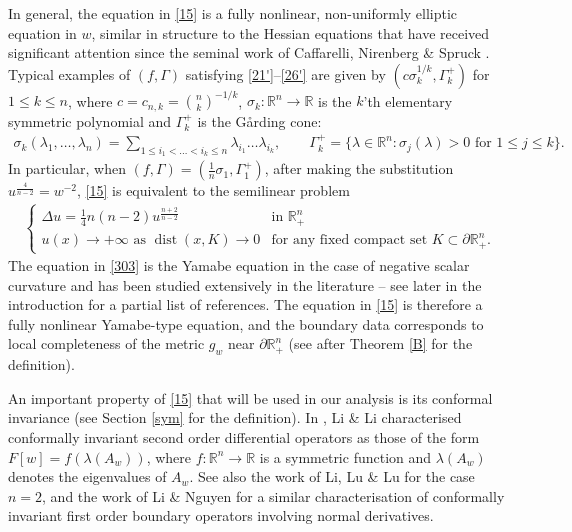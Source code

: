 \documentclass[12pt]{article}
\numberwithin{equation}{section}
\theoremstyle{plain}
\theoremstyle{definition}
\begin{document}
In general, the equation in \eqref{15} is a fully nonlinear, non-uniformly elliptic equation in $w$, similar in structure to the Hessian equations that have received significant attention since the seminal work of Caffarelli, Nirenberg \& Spruck \cite{CNS3}. Typical examples of $(f,\Gamma)$ satisfying \eqref{21'}--\eqref{26'} are given by $(c\sigma_k^{1/k}, \Gamma_k^+)$ for $1\leq k \leq n$, where $c = c_{n,k} =\binom{n}{k}^{-1/k}$, $\sigma_k:\mathbb{R}^n\rightarrow\mathbb{R}$ is the $k$'th elementary symmetric polynomial and $\Gamma_k^+$ is the G{\aa}rding cone:
\begin{align*}
\sigma_k(\lambda_1,\dots,\lambda_n) = \sum_{1\leq i_1 < \dots< i_k \leq n} \lambda_{i_1}\dots\lambda_{i_k}, \qquad \Gamma_k^+ = \{\lambda \in\mathbb{R}^n : \sigma_j(\lambda)>0 \text{ for }1 \leq j \leq k\}.
\end{align*}
In particular, when $(f,\Gamma) = (\frac{1}{n}\sigma_1, \Gamma_1^+)$, after making the substitution $u^{\frac{4}{n-2}} = w^{-2}$, \eqref{15} is equivalent to the semilinear problem
\begin{align}\label{303}
\begin{cases}
\Delta u = \frac{1}{4}n(n-2)u^{\frac{n+2}{n-2}} & \text{in }\mathbb{R}_+^n \\
u(x) \rightarrow +\infty \text{ as }\operatorname{dist}(x,K)\rightarrow 0 & \text{for any fixed compact set }K\subset\partial\mathbb{R}_+^n. 
\end{cases}
\end{align}
The equation in \eqref{303} is the Yamabe equation in the case of negative scalar curvature and has been studied extensively in the literature -- see later in the introduction for a partial list of references. The equation in \eqref{15} is therefore a fully nonlinear Yamabe-type equation, and the boundary data corresponds to local completeness of the metric $g_w$ near $\partial\mathbb{R}_+^n$ (see after Theorem \ref{B} for the definition). \medskip 
 

An important property of \eqref{15} that will be used in our analysis is its conformal invariance (see Section \ref{sym} for the definition). In \cite{LL03}, Li \& Li characterised conformally invariant second order differential operators as those of the form $F[w] = f(\lambda(A_w))$, where $f:\mathbb{R}^n\rightarrow\mathbb{R}$ is a symmetric function and $\lambda(A_w)$ denotes the eigenvalues of $A_w$. See also the work of Li, Lu \& Lu \cite{LLL21} for the case $n=2$, and the work of Li \& Nguyen \cite{LN09b} for a similar characterisation of conformally invariant first order boundary operators involving normal derivatives.\medskip 
\end{document}
